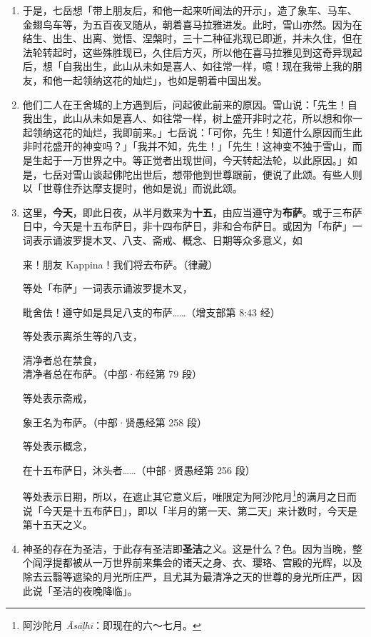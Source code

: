 \begin{enumerate}
\item 于是，七岳想「带上朋友后，和他一起来听闻法的开示」，造了象车、马车、金翅鸟车等，为五百夜叉随从，朝着喜马拉雅进发。此时，雪山亦然。因为在结生、出生、出离、觉悟、涅槃时，三十二种征兆现已即逝，并未久住，但在法轮转起时，这些殊胜现已，久住后方灭，所以他在喜马拉雅见到这奇异现起后，想「自我出生，此山从未如是喜人、如往常一样，噫！现在我带上我的朋友，和他一起领纳这花的灿烂」，也如是朝着中国出发。
\item 他们二人在王舍城的上方遇到后，问起彼此前来的原因。雪山说：「先生！自我出生，此山从未如是喜人、如往常一样，树上盛开非时之花，所以想和你一起领纳这花的灿烂，我即前来。」七岳说：「可你，先生！知道什么原因而生此非时花盛开的神变吗？」「我并不知，先生！」「先生！这神变不独于雪山，而是生起于一万世界之中。等正觉者出现世间，今天转起法轮，以此原因。」如是，七岳对雪山谈起佛陀出世后，想带他到世尊跟前，便说了此颂。有些人则以「世尊住乔达摩支提时，他如是说」而说此颂。
\item 这里，\textbf{今天}，即此日夜，从半月数来为\textbf{十五}，由应当遵守为\textbf{布萨}。或于三布萨日中，今天是十五布萨日，非十四布萨日，非和合布萨日。或因为「布萨」一词表示诵波罗提木叉、八支、斋戒、概念、日期等众多意义，如\begin{quoting}来！朋友 Kappina！我们将去布萨。（律藏）\end{quoting}等处「布萨」一词表示诵波罗提木叉，\begin{quoting}毗舍佉！遵守如是具足八支的布萨……（增支部第 8:43 经）\end{quoting}等处表示离杀生等的八支，\begin{quoting}清净者总在禁食，\\清净者总在布萨。（中部·布经第 79 段）\end{quoting}等处表示斋戒，\begin{quoting}象王名为布萨。（中部·贤愚经第 258 段）\end{quoting}等处表示概念，\begin{quoting}在十五布萨日，沐头者……（中部·贤愚经第 256 段）\end{quoting}等处表示日期，所以，在遮止其它意义后，唯限定为阿沙陀月\footnote{阿沙陀月 \textit{Āsāḷhī}：即现在的六～七月。}的满月之日而说「今天是十五布萨日」，即以「半月的第一天、第二天」来计数时，今天是第十五天之义。
\item 神圣的存在为圣洁，于此存有圣洁即\textbf{圣洁}之义。这是什么？色。因为当晚，整个阎浮提都被从一万世界前来集会的诸天之身、衣、璎珞、宫殿的光辉，以及除去云翳等遮染的月光所庄严，且尤其为最清净之天的世尊的身光所庄严，因此说「圣洁的夜晚降临」。

\end{enumerate}
